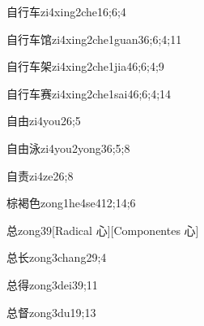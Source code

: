 \begin{verbete}{自行车}{zi4xing2che1}{6;6;4}
\end{verbete}

\begin{verbete}{自行车馆}{zi4xing2che1guan3}{6;6;4;11}
\end{verbete}

\begin{verbete}{自行车架}{zi4xing2che1jia4}{6;6;4;9}
\end{verbete}

\begin{verbete}{自行车赛}{zi4xing2che1sai4}{6;6;4;14}
\end{verbete}

\begin{verbete}{自由}{zi4you2}{6;5}
\end{verbete}

\begin{verbete}{自由泳}{zi4you2yong3}{6;5;8}
\end{verbete}

\begin{verbete}{自责}{zi4ze2}{6;8}
\end{verbete}

\begin{verbete}{棕褐色}{zong1he4se4}{12;14;6}
\end{verbete}

\begin{verbete}{总}{zong3}{9}[Radical 心][Componentes 心]
\end{verbete}

\begin{verbete}{总长}{zong3chang2}{9;4}
\end{verbete}

\begin{verbete}{总得}{zong3dei3}{9;11}
\end{verbete}

\begin{verbete}{总督}{zong3du1}{9;13}
\end{verbete}

